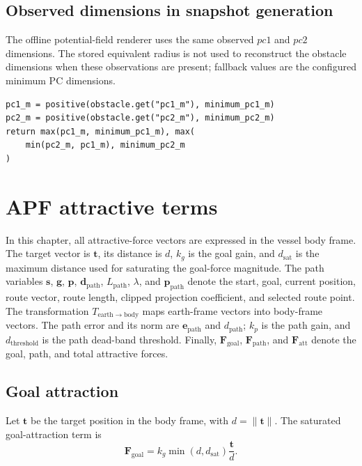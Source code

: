 \documentclass[11pt,a4paper]{article}
\begin{document}
\subsection{Observed dimensions in snapshot generation}

The offline potential-field renderer uses the same observed $pc1$ and $pc2$ dimensions. The stored equivalent radius is not used to reconstruct the obstacle dimensions when these observations are present; fallback values are the configured minimum PC dimensions.

\begin{lstlisting}
pc1_m = positive(obstacle.get("pc1_m"), minimum_pc1_m)
pc2_m = positive(obstacle.get("pc2_m"), minimum_pc2_m)
return max(pc1_m, minimum_pc1_m), max(
    min(pc2_m, pc1_m), minimum_pc2_m
)
\end{lstlisting}

\section{APF attractive terms}

In this chapter, all attractive-force vectors are expressed in the vessel body
frame. The target vector is $\bm{t}$, its distance is $d$, $k_g$ is the goal
gain, and $d_{\mathrm{sat}}$ is the maximum distance used for saturating the
goal-force magnitude. The path variables $\bm{s}$, $\bm{g}$, $\bm{p}$,
$\bm{d}_{\mathrm{path}}$, $L_{\mathrm{path}}$, $\lambda$, and
$\bm{p}_{\mathrm{path}}$ denote the start, goal, current position, route
vector, route length, clipped projection coefficient, and selected route
point. The transformation $T_{\mathrm{earth}\rightarrow\mathrm{body}}$
maps earth-frame vectors into body-frame vectors. The path error and its norm
are $\bm{e}_{\mathrm{path}}$ and $d_{\mathrm{path}}$; $k_p$ is the path gain,
and $d_{\mathrm{threshold}}$ is the path dead-band threshold. Finally,
$\bm{F}_{\mathrm{goal}}$, $\bm{F}_{\mathrm{path}}$, and
$\bm{F}_{\mathrm{att}}$ denote the goal, path, and total attractive forces.

\subsection{Goal attraction}

Let $\bm{t}$ be the target position in the body frame, with
$d=\lVert\bm{t}\rVert$. The saturated goal-attraction term is
\begin{equation}
\bm{F}_{\mathrm{goal}}=k_g\min(d,d_{\mathrm{sat}})\frac{\bm{t}}{d}.
\end{equation}
\end{document}
